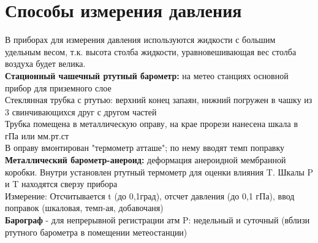 
\section{Способы измерения давления}
В приборах для измерения давления используются жидкости с большим удельным весом, т.к. высота столба жидкости, уравновешивающая вес столба воздуха будет велика.\\
\textbf{Стационный чашечный ртутный барометр:} на метео станциях основной прибор для приземного слое\\
Стеклянная трубка с ртутью: верхний конец запаян, нижний погружен в чашку из 3 свинчивающихся друг с другом частей\\
Трубка помещена в металлическую оправу, на крае прорези нанесена шкала в гПа или мм.рт.ст\\
В оправу вмонтирован "термометр атташе"; по нему вводят темп поправку\\

\textbf{Металлический барометр-анероид:} деформация анероидной мембранной коробки. Внутри установлен ртутный термометр для оценки влияния T. Шкалы P и T находятся сверзу прибора\\
Измерение: Отсчитывается t (до 0,1град), отсчет давления (до 0,1 гПа), ввод поправок (шкаловая, темп-ая, добавочаня)\\

\textbf{Барограф} - для непрерывной регистрации атм P: недельный и суточный (вблизи ртутного барометра в помещении метеостанции)
